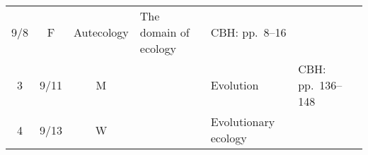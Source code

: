 \documentclass[]{article}
\begin{document}
\begin{longtable}[]{@{}ccclll@{}}
\begin{minipage}[t]{0.08\columnwidth}
9/8\strut
\end{minipage} & \begin{minipage}[t]{0.07\columnwidth}\centering\strut
F\strut
\end{minipage} & \begin{minipage}[t]{0.10\columnwidth}\raggedright\strut
Autecology\strut
\end{minipage} & \begin{minipage}[t]{0.12\columnwidth}\raggedright\strut
The domain of ecology\strut
\end{minipage} & \begin{minipage}[t]{0.12\columnwidth}\raggedright\strut
CBH: pp.~8--16\strut
\end{minipage}\tabularnewline
\begin{minipage}[t]{0.13\columnwidth}\centering\strut
3\strut
\end{minipage} & \begin{minipage}[t]{0.08\columnwidth}\centering\strut
9/11\strut
\end{minipage} & \begin{minipage}[t]{0.07\columnwidth}\centering\strut
M\strut
\end{minipage} & \begin{minipage}[t]{0.10\columnwidth}\raggedright\strut
\strut
\end{minipage} & \begin{minipage}[t]{0.12\columnwidth}\raggedright\strut
Evolution\strut
\end{minipage} & \begin{minipage}[t]{0.12\columnwidth}\raggedright\strut
CBH: pp.~136--148\strut
\end{minipage}\tabularnewline
\begin{minipage}[t]{0.13\columnwidth}\centering\strut
4\strut
\end{minipage} & \begin{minipage}[t]{0.08\columnwidth}\centering\strut
9/13\strut
\end{minipage} & \begin{minipage}[t]{0.07\columnwidth}\centering\strut
W\strut
\end{minipage} & \begin{minipage}[t]{0.10\columnwidth}\raggedright\strut
\strut
\end{minipage} & \begin{minipage}[t]{0.12\columnwidth}\raggedright\strut
Evolutionary ecology\strut
\end{minipage} & \begin{minipage}[t]{0.12\columnwidth}\raggedright\strut

\end{minipage}
\end{longtable}
\end{document}
